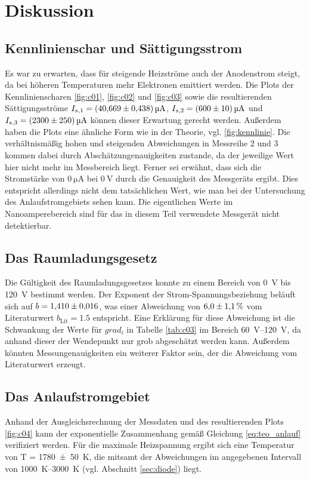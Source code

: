 \section{Diskussion}

\subsection{Kennlinienschar und Sättigungsstrom}
Es war zu erwarten, dass für steigende Heizströme auch der Anodenstrom steigt, da bei höheren Temperaturen mehr
Elektronen emittiert werden.
Die Plots der Kennlinienscharen \ref{fig:c01}, \ref{fig:c02} und \ref{fig:c03} sowie die resultierenden 
Sättigungsströme $I_{s,1} = \qty{40.669 \pm 0.438}{\micro\ampere}$, $I_{s,2} = \qty{600 \pm 10}{\micro\ampere}$ und 
$I_{s,3}= \qty{2300 \pm 250}{\micro\ampere}$ können dieser Erwartung gerecht werden.
Außerdem haben die Plots eine ähnliche Form wie in der Theorie, vgl. \ref{fig:kennlinie}.
Die verhältnismäßig hohen und steigenden Abweichungen in Messreihe 2 und 3 kommen dabei durch Abschätzungenauigkeiten zustande,
da der jeweilige Wert hier nicht mehr im Messbereich liegt.
Ferner sei erwähnt, dass sich die Stromstärke von $\qty[]{0}{\micro\ampere}$ bei $\qty[]{0}{\volt}$ durch die Genauigkeit des 
Messgeräts ergibt.
Dies entspricht allerdings nicht dem tatsächlichen Wert, wie man bei der Untersuchung des Anlaufstromgebiets sehen kann.
Die eigentlichen Werte im Nanoamperebereich sind für das in diesem Teil verwendete Messgerät nicht detektierbar.




\subsection{Das Raumladungsgesetz}
Die Gültigkeit des Raumladungsgesetzes konnte zu einem Bereich von \qty[]{0}{\volt} bis \qty{120}{\volt} bestimmt werden.
Der Exponent der Strom-Spannungsbeziehung beläuft sich auf $b = \num{1.410 \pm 0.016}$, was einer Abweichung von 
$\num{6.0+-1.1}\, \%$ vom Literaturwert $b_\text{Lit} = \num[]{1.5}$ entspricht.
Eine Erklärung für diese Abweichung ist die Schwankung der Werte für $grad_i$ in Tabelle \ref{tab:c03} im Bereich \qtyrange[]{60}{120}{\volt},
da anhand dieser der Wendepunkt nur grob abgeschätzt werden kann.
Außerdem könnten Messungenauigkeiten ein weiterer Faktor sein, der die Abweichung vom Literaturwert erzeugt.



\subsection{Das Anlaufstromgebiet}
Anhand der Ausgleichsrechnung der Messdaten und des resultierenden Plots \ref{fig:c04} kann der exponentielle Zusammenhang gemäß 
Gleichung \eqref{eq:teo_anlauf} verifiziert werden.
Für die maximale Heizspannung ergibt sich eine Temperatur von T = \qty{1780 +- 50}{\kelvin}, die
mitsamt der Abweichungen im angegebenen Intervall von \qtyrange[]{1000}{3000}{\kelvin}
(vgl. Abschnitt \ref{sec:diode}) liegt.

